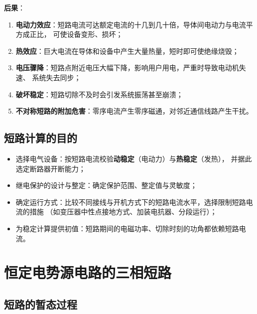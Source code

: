 \textbf{后果}：
\begin{enumerate}
  \item \textbf{电动力效应}：短路电流可达额定电流的十几到几十倍，导体间电动力与电流平方成正比，
        可使设备变形、损坏；
  \item \textbf{热效应}：巨大电流在导体和设备中产生大量热量，短时即可使绝缘烧毁；
  \item \textbf{电压骤降}：短路点附近电压大幅下降，影响用户用电，严重时导致电动机失速、
        系统失去同步；
  \item \textbf{破坏稳定}：短路切除不及时会引发系统振荡甚至崩溃；
  \item \textbf{不对称短路的附加危害}：零序电流产生零序磁通，对邻近通信线路产生干扰。
\end{enumerate}

\subsection{短路计算的目的}

\begin{itemize}
  \item 选择电气设备：按短路电流校验\textbf{动稳定}（电动力）与\textbf{热稳定}（发热），
        并据此选定断路器开断能力；
  \item 继电保护的设计与整定：确定保护范围、整定值与灵敏度；
  \item 确定运行方式：比较不同接线与开机方式下的短路电流水平，选择限制短路电流的措施
        （如变压器中性点接地方式、加装电抗器、分段运行）；
  \item 为稳定计算提供初值：短路期间的电磁功率、切除时刻的功角都依赖短路电流。
\end{itemize}


\section{恒定电势源电路的三相短路}

\subsection{短路的暂态过程}

